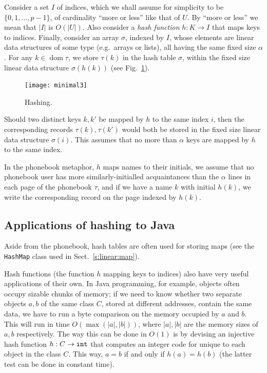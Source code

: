\documentclass[a4paper]{book}
\theoremstyle{changebreak}                %
\DeclareMathOperator{\dom}{\mathrm{dom}}
\begin{document}
Consider a set $I$ of indices, which we shall assume
for simplicity to be $\{0,1,\ldots,p-1\}$, of cardinality ``more or
less'' like that of $U$. By ``more or less'' we mean that $|I|$ is
$O(|U|)$. Also consider a {\it hash function}
$h:K\to I$ that maps keys to indices. Finally, consider an array
$\sigma$, indexed by $I$, whose elements are linear data structures of
some type (e.g.~arrays or lists), all having the same fixed size
$\alpha$. For any $k\in\dom{\tau}$, we 
store
$\tau(k)$ in the hash table $\sigma$, within the fixed size linear
data structure $\sigma(h(k))$ (see Fig.~\ref{f:hash}).
\begin{figure}[!ht]
\begin{center}
\psfrag{domtau}{$\dom\tau$}
\texttt{[image: minimal3]}
\end{center}
\caption{Hashing.}
\label{f:hash}
\end{figure}
Should two distinct keys $k,k'$ be mapped by $h$ to the
same index $i$, then the corresponding
records $\tau(k),\tau(k')$ would both be stored in the
fixed size linear data structure $\sigma(i)$. This assumes that no
more than $\alpha$ keys are mapped by $h$ to the same index.

In the phonebook metaphor, $h$ maps names to their initials, we assume
that no phonebook user has more similarly-initialled acquaintances
than the $\alpha$ lines in each page of the phonebook $\tau$, and if
we have a name $k$ with initial $h(k)$, we write the corresponding
record on the page indexed by $h(k)$.

\subsection{Applications of hashing to Java}
Aside from the phonebook, hash tables are often used for storing maps
(see the {\tt HashMap} class used in Sect.~\ref{s:linear:map}). 

Hash functions (the function $h$ mapping keys to indices) also have
very useful applications of their own. In Java
programming, for example, objects often occupy
sizable chunks of memory; if we need to know whether two separate
objects $a,b$ of the same class $C$, stored at different addresses,
contain the same data, we have to run a byte
comparison on the memory occupied by $a$ and
$b$. This will run in time $O(\max(|a|,|b|))$, where $|a|,|b|$ are the
memory sizes of $a,b$ respectively. The way this
can be done in $O(1)$ is by devising an injective hash
function $h:C\to {\tt int}$ that
computes an integer code for unique to each object in the class
$C$. This way, $a=b$ if and only if $h(a)=h(b)$ (the latter test can
be done in constant time).
\end{document}
